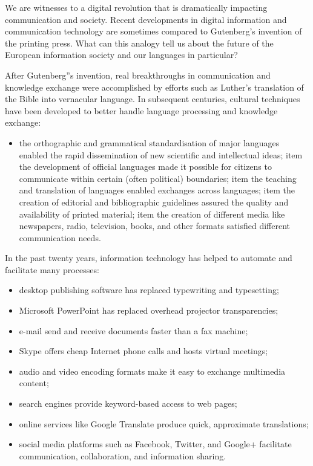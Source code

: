 \documentclass[]{../../metanetpaper}
\begin{document}
\begin{multicols}{2}

We are witnesses to a digital revolution that is dramatically impacting
communication and society. Recent developments in digital information and
communication technology are sometimes compared to Gutenberg's invention of
the printing press. What can this analogy tell us about the future of the
European information society and our languages in particular?



After Gutenberg''s invention, real breakthroughs in communication and
knowledge exchange were accomplished by efforts such as Luther's translation
of the Bible into vernacular language. In subsequent centuries, cultural
techniques have been developed to better handle language processing and
knowledge exchange:

\begin{itemize}
\item the orthographic and grammatical standardisation of major languages enabled
the rapid dissemination of new scientific and intellectual ideas;
item the development of official languages made it possible for citizens to
 communicate within certain (often political) boundaries;
item the teaching and translation of languages enabled exchanges across languages;
item the creation of editorial and bibliographic guidelines assured the quality and
availability of printed material;
item the creation of different media like newspapers, radio, television, books,
 and other formats satisfied different communication needs. 
\end{itemize}


In the past twenty years, information technology has helped to automate and facilitate many processes:
\begin{itemize}
\item desktop publishing software has replaced typewriting and typesetting;
\item Microsoft PowerPoint has replaced overhead projector transparencies;
\item e-mail send and receive documents faster than a fax machine;
\item Skype offers cheap Internet phone calls and hosts virtual meetings;
\item audio and video encoding formats make it easy to exchange multimedia
  content;
\item search engines provide keyword-based access to web pages;
\item online services like Google Translate produce quick, approximate
  translations;
\item social media platforms such as Facebook, Twitter, and Google+ facilitate
  communication, collaboration, and information sharing.
\end{itemize}



\end{multicols}
\end{document}
